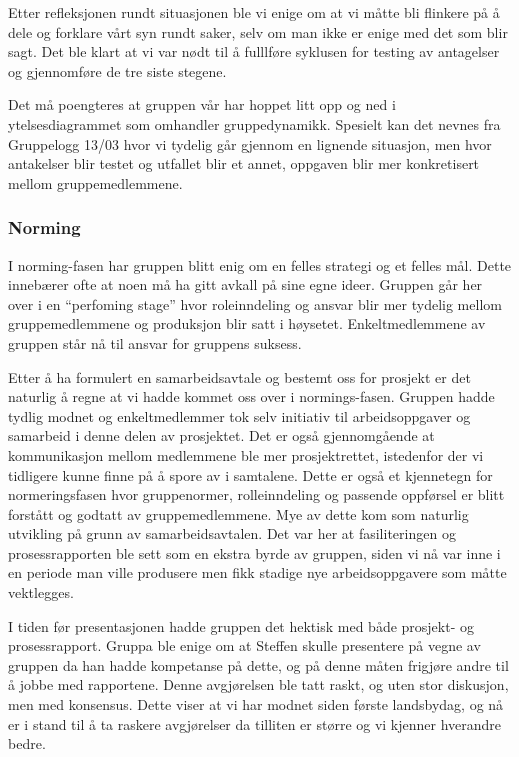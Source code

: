 \documentclass[a4paper,norsk,oneside]{article}
\begin{document}
Etter refleksjonen rundt situasjonen ble vi enige om at vi måtte bli flinkere på å dele og forklare vårt syn rundt saker, selv om man ikke er enige med det som blir sagt. Det ble klart at vi var nødt til å fulllføre syklusen for testing av antagelser og gjennomføre de tre siste stegene. 

Det må poengteres at gruppen vår har hoppet litt opp og ned i ytelsesdiagrammet som omhandler gruppedynamikk. Spesielt kan det nevnes fra Gruppelogg 13/03 hvor vi tydelig går gjennom en lignende situasjon, men hvor antakelser blir testet og utfallet blir et annet, oppgaven blir mer konkretisert mellom gruppemedlemmene. 

\subsubsection{Norming}
I norming-fasen har gruppen blitt enig om en felles strategi og et felles mål. Dette innebærer ofte at noen må ha gitt avkall på sine egne ideer. Gruppen går her over i en “perfoming stage” \cite{johnson2008joining} hvor roleinndeling og ansvar blir mer tydelig mellom gruppemedlemmene og produksjon blir satt i høysetet. Enkeltmedlemmene av gruppen står nå til ansvar for gruppens suksess.

Etter å ha formulert en samarbeidsavtale og bestemt oss for prosjekt er det naturlig å regne at vi hadde kommet oss over i normings-fasen. Gruppen hadde tydlig modnet og enkeltmedlemmer tok selv initiativ til arbeidsoppgaver og samarbeid i denne delen av prosjektet. Det er også gjennomgående at kommunikasjon mellom medlemmene ble mer prosjektrettet, istedenfor der vi tidligere kunne finne på å spore av i samtalene. Dette er også et kjennetegn for normeringsfasen hvor gruppenormer, rolleinndeling og passende oppførsel er blitt forstått og godtatt av gruppemedlemmene. Mye av dette kom som naturlig utvikling på grunn av samarbeidsavtalen. Det var her at fasiliteringen og prosessrapporten ble sett som en ekstra byrde av gruppen, siden vi nå var inne i en periode man ville produsere men fikk stadige nye arbeidsoppgavere som måtte vektlegges. 

I tiden før presentasjonen hadde gruppen det hektisk med både prosjekt- og prosessrapport. Gruppa ble enige om at Steffen skulle presentere på vegne av gruppen da han hadde kompetanse på dette, og på denne måten frigjøre andre til å jobbe med rapportene. Denne avgjørelsen ble tatt raskt, og uten stor diskusjon, men med konsensus. Dette viser at vi har modnet siden første landsbydag, og nå er i stand til å ta raskere avgjørelser da tilliten er større og vi kjenner hverandre bedre.
\end{document}
